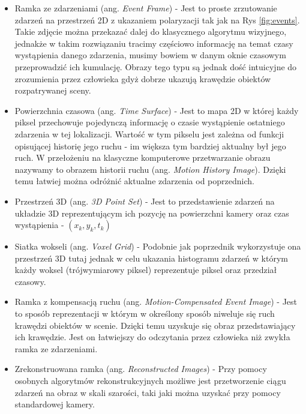     \begin{itemize}
    
        \item Ramka ze zdarzeniami (ang. \emph{Event Frame}) - Jest to proste zrzutowanie zdarzeń na przestrzeń 2D z ukazaniem polaryzacji tak jak na Rys \ref{fig:events}. Takie zdjęcie można przekazać dalej do klasycznego algorytmu wizyjnego, jednakże w takim rozwiązaniu tracimy częściowo informację na temat czasy wystąpienia danego zdarzenia, musimy bowiem w danym oknie czasowym przeprowadzić ich kumulację. Obrazy tego typu są jednak dość intuicyjne do zrozumienia przez człowieka gdyż dobrze ukazują krawędzie obiektów rozpatrywanej sceny.
        
        \item Powierzchnia czasowa (ang. \emph{Time Surface}) - Jest to mapa 2D w której każdy piksel przechowuje pojedynczą informację o czasie wystąpienie ostatniego zdarzenia w tej lokalizacji. Wartość w tym pikselu jest zależna od funkcji opisującej historię jego ruchu - im większa tym bardziej aktualny był jego ruch. W przełożeniu na klasyczne komputerowe przetwarzanie obrazu nazywamy to obrazem historii ruchu (ang. \emph{Motion History Image}). Dzięki temu łatwiej można odróżnić aktualne zdarzenia od poprzednich.
        
        \item Przestrzeń 3D (ang. \emph{3D Point Set}) - Jest to przedstawienie zdarzeń na układzie 3D reprezentującym ich pozycję na powierzchni kamery oraz czas wystąpienia - \((x_k, y_k, t_k)\) 
        
        \item Siatka wokseli (ang. \emph{Voxel Grid}) - Podobnie jak poprzednik wykorzystuje ona przestrzeń 3D tutaj jednak w celu ukazania histogramu zdarzeń w którym każdy woksel (trójwymiarowy piksel) reprezentuje piksel oraz przedział czasowy.
        
        
        \item Ramka z kompensacją ruchu (ang. \emph{Motion-Compensated Event Image}) - Jest to sposób reprezentacji w którym w określony sposób niweluje się ruch krawędzi obiektów w scenie. Dzięki temu uzyskuje się obraz przedstawiający ich krawędzie. Jest on łatwiejszy do odczytania przez człowieka niż zwykła ramka ze zdarzeniami. 
        
        \item Zrekonstruowana ramka (ang. \emph{Reconstructed Images}) - Przy pomocy osobnych algorytmów rekonstrukcyjnych możliwe jest przetworzenie ciągu zdarzeń na obraz w skali szarości, taki jaki można uzyskać przy pomocy standardowej kamery.
    \end{itemize}
    

